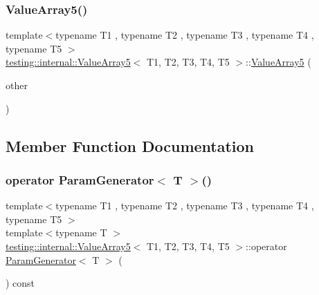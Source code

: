 \mbox{\label{classtesting_1_1internal_1_1_value_array5_a7de67e844073d0ec3c7c6e5736fb9ba6}} 
\subsubsection{\texorpdfstring{ValueArray5()}{ValueArray5()}\hspace{0.1cm}{\footnotesize\ttfamily [2/2]}}
{\footnotesize\ttfamily template$<$typename T1 , typename T2 , typename T3 , typename T4 , typename T5 $>$ \\
\mbox{\hyperlink{classtesting_1_1internal_1_1_value_array5}{testing\+::internal\+::\+Value\+Array5}}$<$ T1, T2, T3, T4, T5 $>$\+::\mbox{\hyperlink{classtesting_1_1internal_1_1_value_array5}{Value\+Array5}} (\begin{DoxyParamCaption}\item[{const \mbox{\hyperlink{classtesting_1_1internal_1_1_value_array5}{Value\+Array5}}$<$ T1, T2, T3, T4, T5 $>$ \&}]{other }\end{DoxyParamCaption})\hspace{0.3cm}{\ttfamily [inline]}}



\subsection{Member Function Documentation}
\mbox{\label{classtesting_1_1internal_1_1_value_array5_ab925a168d89be9964c4319e5212222c1}} 
\subsubsection{\texorpdfstring{operator ParamGenerator$<$ T $>$()}{operator ParamGenerator< T >()}}
{\footnotesize\ttfamily template$<$typename T1 , typename T2 , typename T3 , typename T4 , typename T5 $>$ \\
template$<$typename T $>$ \\
\mbox{\hyperlink{classtesting_1_1internal_1_1_value_array5}{testing\+::internal\+::\+Value\+Array5}}$<$ T1, T2, T3, T4, T5 $>$\+::operator \mbox{\hyperlink{classtesting_1_1internal_1_1_param_generator}{Param\+Generator}}$<$ T $>$ (\begin{DoxyParamCaption}{ }\end{DoxyParamCaption}) const\hspace{0.3cm}{\ttfamily [inline]}}

